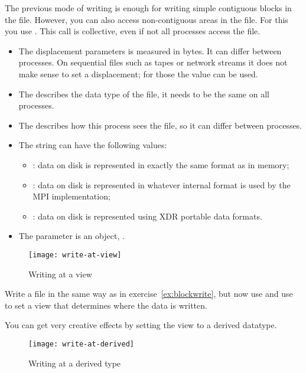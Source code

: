 The previous mode of writing is enough for writing simple contiguous blocks in the file.
However,
you can also access non-contiguous areas in the file. For this you use
%
.
%
This call is collective, even if not all processes access the file.
\begin{itemize}
\item The  displacement parameters is measured in bytes. It
  can differ between processes. On sequential files such as tapes or
  network streams it does not make sense to set a displacement; for
  those the  value can be
  used.
\item The  describes the data type of the file, it needs to
  be the same on all processes.
\item The  describes how this process sees the file, so it
  can differ between processes.
\item The  string can have the following values:
  \begin{itemize}
  \item {}: data on disk is represented in exactly the same
    format as in memory;
  \item {}: data on disk is represented in whatever internal
    format is used by the MPI implementation;
  \item {}: data on disk is represented using XDR portable
    data formats.
  \end{itemize}
\item The  parameter is an  object,
  .
\end{itemize}

\begin{figure}[ht]
  \label{fig:write-view}
  \caption{Writing at a view}
  \texttt{[image: write-at-view]}
\end{figure}

\begin{exercise}
  \label{ex:viewwrite}
  Write a file in the same way as in exercise~\ref{ex:blockwrite},
  but now use  and use  to set
  a view that determines where the data is written.
\end{exercise}

You can get very creative effects by setting the view to a derived
datatype.

\begin{figure}[ht]
  \label{fig:write-derived}
  \caption{Writing at a derived type}
  \texttt{[image: write-at-derived]}
\end{figure}

